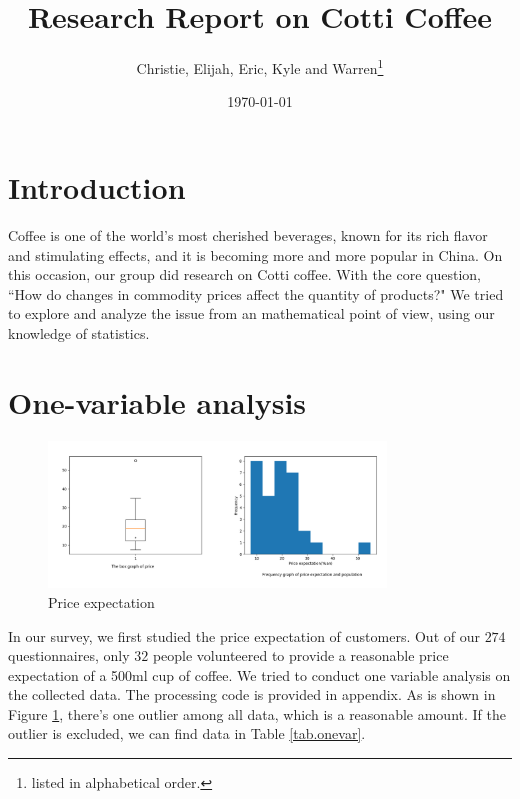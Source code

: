 \documentclass[a4paper]{article}
\begin{document}
\begin{titlepage}
    \title{\textbf{Research Report on Cotti Coffee}}
    \author{Christie, Elijah, Eric, Kyle and Warren\footnote{listed in alphabetical order.}}
    \date{\today}
    \maketitle
    \tableofcontents
\end{titlepage}

\section{Introduction}

Coffee is one of the world's most cherished beverages, known for its rich flavor and stimulating effects, and it is becoming more and more popular in China. On this occasion, our group did research on Cotti coffee. With the core question, ``How do changes in commodity prices affect the quantity of products?" We tried to explore and analyze the issue from an mathematical point of view, using our knowledge of statistics.

\section{One-variable analysis}

\begin{figure}[ht]
    \centering
    \includegraphics[width = 0.8\textwidth]{boxandhist.png}
    \caption{Price expectation}
    \label{fig.bnw} 
\end{figure}

In our survey, we first studied the price expectation of customers. Out of our $274$ questionnaires, only $32$ people volunteered to provide a reasonable price expectation of a 500ml cup of coffee. We tried to conduct one variable analysis on the collected data. The processing code is provided in appendix. As is shown in Figure \ref{fig.bnw}, there's one outlier among all data, which is a reasonable amount. If the outlier is excluded, we can find data in Table \ref{tab.onevar}.
\end{document}
